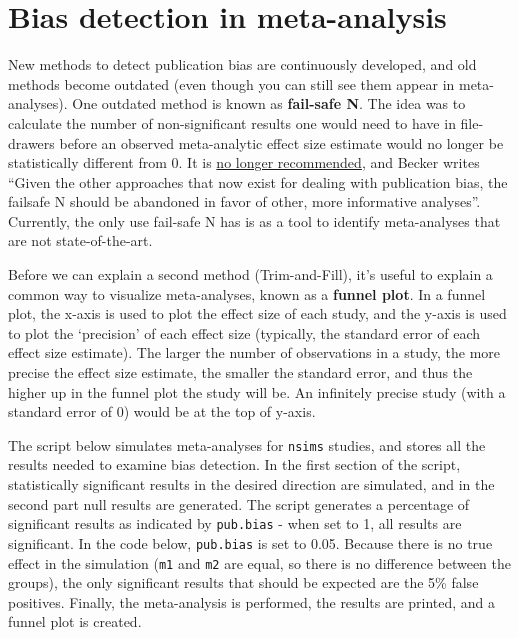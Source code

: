 \documentclass[
  oneside]{krantz}
\begin{document}
\hypertarget{bias-detection-in-meta-analysis}{%
\section{Bias detection in meta-analysis}\label{bias-detection-in-meta-analysis}}

New methods to detect publication bias are continuously developed, and old methods become outdated (even though you can still see them appear in meta-analyses). One outdated method is known as \textbf{fail-safe N}. The idea was to calculate the number of non-significant results one would need to have in file-drawers before an observed meta-analytic effect size estimate would no longer be statistically different from 0. It is \href{https://handbook-5-1.cochrane.org/chapter_10/10_4_4_3_fail_safe_n.htm}{no longer recommended}, and Becker \citeyearpar{becker_failsafe_2005} writes ``Given the other approaches that now exist for dealing with publication bias, the failsafe N should be abandoned in favor of other, more informative analyses''. Currently, the only use fail-safe N has is as a tool to identify meta-analyses that are not state-of-the-art.

Before we can explain a second method (Trim-and-Fill), it's useful to explain a common way to visualize meta-analyses, known as a \textbf{funnel plot}. In a funnel plot, the x-axis is used to plot the effect size of each study, and the y-axis is used to plot the `precision' of each effect size (typically, the standard error of each effect size estimate). The larger the number of observations in a study, the more precise the effect size estimate, the smaller the standard error, and thus the higher up in the funnel plot the study will be. An infinitely precise study (with a standard error of 0) would be at the top of y-axis.

The script below simulates meta-analyses for \texttt{nsims} studies, and stores all the results needed to examine bias detection. In the first section of the script, statistically significant results in the desired direction are simulated, and in the second part null results are generated. The script generates a percentage of significant results as indicated by \texttt{pub.bias} - when set to 1, all results are significant. In the code below, \texttt{pub.bias} is set to 0.05. Because there is no true effect in the simulation (\texttt{m1} and \texttt{m2} are equal, so there is no difference between the groups), the only significant results that should be expected are the 5\% false positives. Finally, the meta-analysis is performed, the results are printed, and a funnel plot is created.
\end{document}
